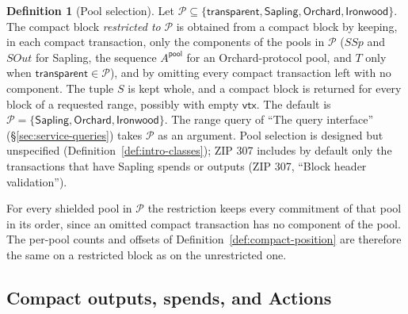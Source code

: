 \documentclass[11pt,a4paper]{article}
\theoremstyle{definition}
\newtheorem{definition}[theorem]{Definition}
\begin{document}
\begin{definition}[Pool selection]
Let $\mathcal{P} \subseteq \{\mathsf{transparent},\allowbreak
\mathsf{Sapling},\allowbreak \mathsf{Orchard},\allowbreak
\mathsf{Ironwood}\}$. The compact block
\emph{restricted to} $\mathcal{P}$ is obtained from a compact block by
keeping, in each compact transaction, only the components of the pools in
$\mathcal{P}$ ($\mathit{SSp}$ and $\mathit{SOut}$ for Sapling, the sequence
$A^{\mathsf{pool}}$ for an Orchard-protocol pool, and $T$ only when
$\mathsf{transparent} \in \mathcal{P}$), and by omitting every compact
transaction left with no component. The tuple $S$ is kept whole, and a
compact block is returned for every block of a requested range, possibly
with empty $\mathsf{vtx}$. The default is $\mathcal{P} = \{\mathsf{Sapling},
\mathsf{Orchard}, \mathsf{Ironwood}\}$. The range query of ``The query
interface'' (\S\ref{sec:service-queries}) takes $\mathcal{P}$ as an
argument. Pool selection is designed but unspecified
(Definition~\ref{def:intro-classes}); ZIP 307 includes by default only the
transactions that have Sapling spends or outputs (ZIP 307, ``Block header
validation'').
\end{definition}

For every shielded pool in $\mathcal{P}$ the restriction keeps every
commitment of that pool in its order, since an omitted compact transaction
has no component of the pool. The per-pool counts and offsets of
Definition~\ref{def:compact-position} are therefore the same on a
restricted block as on the unrestricted one.

\subsection{Compact outputs, spends, and Actions}%
\label{sec:compact-elements}
\end{document}
